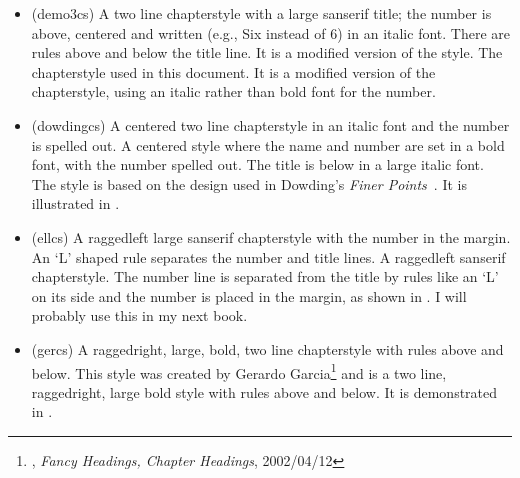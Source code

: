\begin{itemize}
\item[\cstyle{demo3}]
\glossary(demo3cs)%
  {}%
  {A two line chapterstyle with a large sanserif title; the number is above, 
   centered and written (e.g., Six instead of 6) in an italic font. 
   There are rules above and below
   the title line. It is a modified version of the  style.}
   The chapterstyle used in this document. It is a
  modified version of the  chapterstyle, using an italic
  rather than bold font for the number.

\item[\cstyle{dowding}] 
\glossary(dowdingcs)%
  {}%
  { A centered two line chapterstyle in an italic font and the number
   is spelled out.}
A centered style where the name and number are set in a bold font, with the 
number spelled out. The title is below in a large italic font. The style
is based on the design used in Dowding's \textit{Finer Points}~\cite{DOWDING96}.
It is illustrated in 
.



\item[\cstyle{ell}] 
\glossary(ellcs)%
  {}%
  {A raggedleft large sanserif chapterstyle with the number in the margin. An
   `L' shaped rule separates the number and title lines.}
  A raggedleft sanserif chapterstyle. 
  The number line is separated
  from the title by rules like an `L' on its side and the number is placed
  in the margin, as shown in . 
I will probably use this in my next book. 


\item[\cstyle{ger}] 
\glossary(gercs)%
  {}%
  {A raggedright, large, bold, two line chapterstyle with rules
   above and below.}
This style was created by 
Gerardo Garcia\footnote{\ctt,
  \textit{Fancy Headings, Chapter Headings}, 2002/04/12} and is a two line,
  raggedright, large bold style with rules above and below. It is
  demonstrated in .



\end{itemize}
